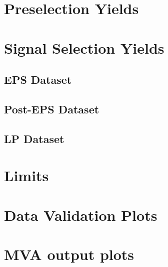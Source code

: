 \documentclass{cmspaper}
\begin{document}
\section{Preselection Yields}

\clearpage
\pagebreak
\section{Signal Selection Yields}
\subsection{EPS Dataset}

\clearpage
\pagebreak
\subsection{Post-EPS Dataset}

\clearpage
\pagebreak
\subsection{LP Dataset}


\clearpage
\section{Limits}

\clearpage
\section{Data Validation Plots}
\label{app:lp_postEPSdist}

\clearpage
\section{MVA output plots}
\label{app:lp_mvaplots}






\clearpage

\end{document}
